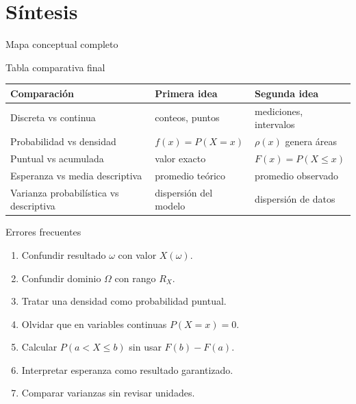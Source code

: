\documentclass[aspectratio=169,11pt]{beamer}
\begin{document}
\section{Síntesis}

\begin{frame}{Mapa conceptual completo}
\centering
{}
\end{frame}

\begin{frame}{Tabla comparativa final}
\tiny
\begin{tabular}{p{}p{}p{}}
\toprule
Comparación & Primera idea & Segunda idea \\
\midrule
Discreta vs continua & conteos, puntos & mediciones, intervalos \\
Probabilidad vs densidad & $f(x)=P(X=x)$ & $\rho(x)$ genera áreas \\
Puntual vs acumulada & valor exacto & $F(x)=P(X\le x)$ \\
Esperanza vs media descriptiva & promedio teórico & promedio observado \\
Varianza probabilística vs descriptiva & dispersión del modelo & dispersión de datos \\
\bottomrule
\end{tabular}
\end{frame}

\begin{frame}{Errores frecuentes}
\small
\begin{enumerate}
  \item Confundir resultado $\omega$ con valor $X(\omega)$.
  \item Confundir dominio $\Omega$ con rango $R_X$.
  \item Tratar una densidad como probabilidad puntual.
  \item Olvidar que en variables continuas $P(X=x)=0$.
  \item Calcular $P(a<X\le b)$ sin usar $F(b)-F(a)$.
  \item Interpretar esperanza como resultado garantizado.
  \item Comparar varianzas sin revisar unidades.
\end{enumerate}
\end{frame}
\end{document}
